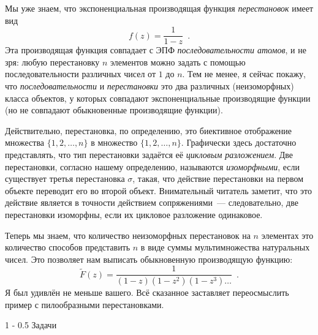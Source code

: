 \documentclass[a5paper]{article}
\makeatletter
\theoremstyle{definition}
\renewcommand{\section}{\@startsection
{section}%
{1}%
{\z@}%
{-\baselineskip}%
{0.5\baselineskip}%
{\centering\large\scshape}} %
\makeatother
\begin{document}
Мы уже знаем, что экспоненциальная производящая функция \textit{перестановок} 
имеет вид
\[
	f(z) = \dfrac{1}{1 - z} \enspace .
\]
Эта производящая функция совпадает с ЭПФ \textit{последовательности атомов}, и 
не зря: любую перестановку \( n \) элементов можно задать с помощью 
последовательности различных чисел от \( 1 \) до \( n \). Тем не менее, я 
сейчас покажу, что \textit{последовательности} и \textit{перестановки} это два 
различных (неизоморфных) класса объектов, у которых совпадают экспоненциальные 
производящие функции (но не совпадают обыкновенные производящие функции).

Действительно, перестановка, по определению, это биективное отображение 
множества \( \{ 1, 2, \ldots, n \} \) в множество \( \{ 1, 2, \ldots, n \} \). 
Графически здесь достаточно представлять, что тип перестановки задаётся её 
\textit{цикловым разложением}. Две перестановки, согласно нашему определению, 
называются \textit{изоморфными}, если существует третья перестановка \( \sigma 
\), такая, что действие перестановки на первом объекте переводит его во второй 
объект. Внимательный читатель заметит, что это действие является в точности 
действием сопряжениями~--- следовательно, две перестановки изоморфны, если их 
цикловое разложение одинаковое.

Теперь мы знаем, что количество неизоморфных перестановок на \( n \) элементах 
это количество способов представить \( n \) в виде суммы мультимножества 
натуральных чисел. Это позволяет нам выписать обыкновенную производящую функцию:
\[
	\widetilde{F}(z) = \dfrac{1}{(1-z)(1-z^2)(1-z^3) \ldots} \enspace .
\]
Я был удивлён не меньше вашего. Всё сказанное заставляет переосмыслить пример с 
пилообразными перестановками.

\section{Задачи}
\end{document}
